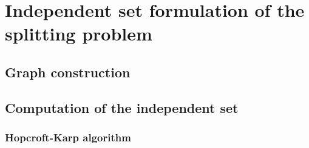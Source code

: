 \chapter{Independent set formulation of the splitting problem} \label{chap:independent_set}
\section{Graph construction}
\section{Computation of the independent set}
\subsection{Hopcroft-Karp algorithm}

